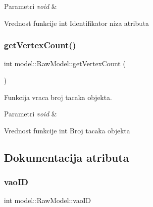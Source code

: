 \begin{DoxyParams}{Parametri}
{\em void} & \\
\hline
\end{DoxyParams}
\begin{DoxyReturn}{Vrednost funkcije}
int Identifikator niza atributa 
\end{DoxyReturn}
\mbox{\label{classmodel_1_1RawModel_a2216788939e3b42e7de828607d4a911d}} 
\subsubsection{\texorpdfstring{get\+Vertex\+Count()}{getVertexCount()}}
{\footnotesize\ttfamily int model\+::\+Raw\+Model\+::get\+Vertex\+Count (\begin{DoxyParamCaption}\item[{void}]{ }\end{DoxyParamCaption})}



Funkcija vraca broj tacaka objekta. 


\begin{DoxyParams}{Parametri}
{\em void} & \\
\hline
\end{DoxyParams}
\begin{DoxyReturn}{Vrednost funkcije}
int Broj tacaka objekta 
\end{DoxyReturn}


\subsection{Dokumentacija atributa}
\mbox{\label{classmodel_1_1RawModel_a325b2b7e719afce688027efbf92e27b7}} 
\subsubsection{\texorpdfstring{vao\+ID}{vaoID}}
{\footnotesize\ttfamily int model\+::\+Raw\+Model\+::vao\+ID\hspace{0.3cm}{\ttfamily [private]}}



